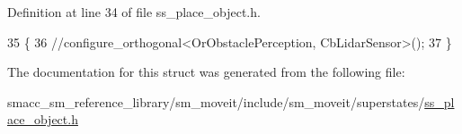 Definition at line 34 of file ss\+\_\+place\+\_\+object.\+h.


\begin{DoxyCode}
35     \{
36         \textcolor{comment}{//configure\_orthogonal<OrObstaclePerception, CbLidarSensor>();}
37     \}
\end{DoxyCode}


The documentation for this struct was generated from the following file\+:\begin{DoxyCompactItemize}
\item 
smacc\+\_\+sm\+\_\+reference\+\_\+library/sm\+\_\+moveit/include/sm\+\_\+moveit/superstates/\hyperlink{ss__place__object_8h}{ss\+\_\+place\+\_\+object.\+h}\end{DoxyCompactItemize}
